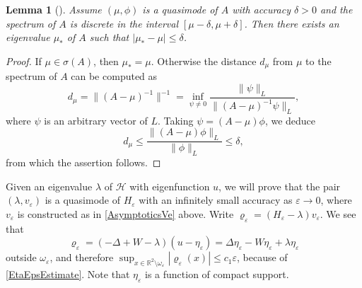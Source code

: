 \documentclass[reqno]{amsart}
\theoremstyle{plain}
\newtheorem{lem}{Lemma}
\numberwithin{equation}{section}
\newcommand{\Real}{\mathbb R}
\newcommand{\eps}{\varepsilon}
\newcommand{\cH}{\mathcal{H}}
\renewcommand{\leq}{\leqslant}
\begin{document}
\begin{lem}[]\label{LemQuasimodes}
   Assume $(\mu, \phi)$ is a quasimode of $A$ with accuracy $\delta>0$ and  the spectrum of $A$ is discrete in  the interval
$[\mu-\delta, \mu+\delta]$. Then there exists an eigenvalue $\mu_*$ of  $A$ such that $|\mu_*-\mu|\leq\delta$.
\end{lem}
\begin{proof}
If $\mu\in \sigma(A)$, then $\mu_*=\mu$. Otherwise  the distance $d_\mu$ from $\mu$ to the spectrum of $A$  can be computed as
\begin{equation*}
  d_\mu=\|(A-\mu)^{-1}\|^{-1}
  =\inf_{\psi\neq0}\frac{\|\psi\|_L}{\|(A-\mu)^{-1}\psi\|_L},
\end{equation*}
where $\psi$ is an arbitrary vector of $L$. Taking $\psi=(A-\mu)\phi$, we deduce
\begin{equation*}
  d_\mu\leq \frac{\|(A-\mu)\phi\|_L}{\|\phi\|_L}\leq \delta,
\end{equation*}
from which the assertion  follows.
\end{proof}

Given an eigenvalue $\lambda$ of $\cH$ with eigenfunction $u$, we will prove that the pair $(\lambda, v_\eps)$ is a quasimode of $H_\eps$ with an infinitely small accuracy as $\eps\to 0$, where $v_\eps$ is  constructed as in \eqref{AsymptoticsVe} above. Write $\varrho_\eps=(H_\eps-\lambda)v_\eps$.
We see that
\begin{equation*}
 \varrho_\eps=(-\Delta+W-\lambda)( u-\eta_\eps)=\Delta\eta_\eps-W\eta_\eps+\lambda\eta_\eps
\end{equation*}
outside $\omega_\eps$, and therefore $\sup_{x\in\Real^2\setminus \omega_\eps}|\varrho_\eps(x)|\leq c_1\eps$, because of \eqref{EtaEpsEstimate}. Note that $\eta_\eps$ is a function of compact support.
\end{document}
